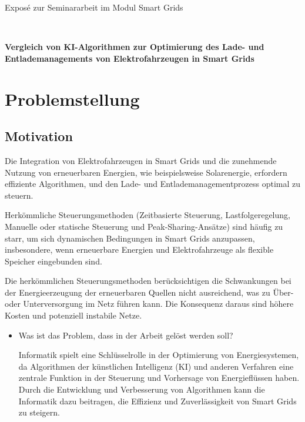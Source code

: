 \documentclass[12pt]{article} %
\begin{document}
\begin{center}
   \baselineskip
   
   Exposé zur Seminararbeit im Modul Smart Grids
   
   ~
   
   {\LARGE\bfseries
     Vergleich von KI-Algorithmen zur Optimierung des Lade- und Entlademanagements
     von Elektrofahrzeugen in Smart Grids}

   \large
   
\end{center}

\section{Problemstellung}

\subsection{Motivation}
Die Integration von Elektrofahrzeugen in Smart Grids und die zunehmende Nutzung von
erneuerbaren Energien, wie beispielsweise Solarenergie, erfordern effiziente Algorithmen,
und den Lade- und Entlademanagementprozess optimal zu steuern.

Herkömmliche Steuerungsmethoden (Zeitbasierte Steuerung, Lastfolgeregelung, Manuelle
oder statische Steuerung und Peak-Sharing-Ansätze) sind häufig zu starr, um sich
dynamischen Bedingungen in Smart Grids anzupassen, insbesondere, wenn erneuerbare
Energien und Elektrofahrzeuge als flexible Speicher eingebunden sind.

Die herkömmlichen Steuerungsmethoden berücksichtigen die Schwankungen bei der Energieerzeugung
der erneuerbaren Quellen nicht ausreichend, was zu Über- oder Unterversorgung im Netz
führen kann. Die Konsequenz daraus sind höhere Kosten und potenziell instabile Netze.



\begin{itemize}
\item Was ist das Problem, dass in der Arbeit gelöst werden soll?

Informatik spielt eine Schlüsselrolle in der Optimierung von Energiesystemen, da Algorithmen der künstlichen Intelligenz (KI) und anderen Verfahren eine zentrale Funktion in der Steuerung und Vorhersage von Energieflüssen haben. Durch die Entwicklung und Verbesserung von Algorithmen kann die Informatik dazu beitragen, die Effizienz und Zuverlässigkeit von Smart Grids zu steigern.
\end{itemize}
\end{document}
